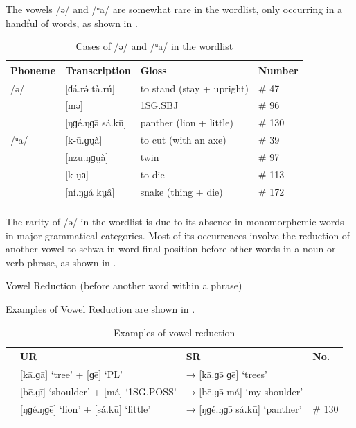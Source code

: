 \documentclass[output=paper,colorlinks,citecolor=brown
]{langscibook}
\begin{document}
The vowels /ə/ and /ᵘa/ are somewhat rare in the wordlist, only occurring in a handful of words, as shown in .

\begin{table}
\caption{Cases of /ə/ and /ᵘa/ in the wordlist}
\label{tab:olson:schwadiphthong}
 \begin{tabular}{llll}
  \lsptoprule
Phoneme & Transcription & Gloss & Number \\
  \midrule
/ə/ & [ɗá.rə́ tà.rú] & to stand (stay + upright) & \# 47 \\
    & [mə̄]         & 1SG.SBJ                      & \# 96 \\
    & [ŋɡé.ŋɡə̄ sá.kū] & panther (lion + little) & \# 130 \\
/ᵘa/ & [k-ū.ɡu̯à] & to cut (with an axe) & \# 39 \\
     & [nzū.ŋɡu̯à] & twin & \# 97 \\
     & [k-u̯a᷆]     & to die & \# 113 \\
     & [ní.ŋɡá ku̯â] & snake (thing + die) & \# 172 \\
  \lspbottomrule
 \end{tabular}
\end{table}

The rarity of /ə/ in the wordlist is due to its absence in monomorphemic words in major grammatical categories. Most of its occurrences involve the reduction of another vowel to schwa in word-final position before other words in a noun or verb phrase, as shown in .

\ea \label{ex:olson:vowelreduction}
Vowel Reduction (before another word within a phrase) \\
\z

Examples of Vowel Reduction are shown in .

\begin{table}
\caption{Examples of vowel reduction}
\label{tab:olson:vowelreduction}
 \begin{tabular}{@{}l@{}lll}
  \lsptoprule
          & UR & SR & No. \\
  \midrule
 & [kā.ɡā] ‘tree’ + [ɡē] ‘PL’ & → [kā.ɡə̄ ɡē] ‘trees’ & \\
 & [bē.ɡī] ‘shoulder’ + [má] ‘1SG.POSS’ & → [bē.ɡə̄ má] ‘my shoulder’ & \\
 & [ŋɡé.ŋɡē] ‘lion’ + [sá.kū] ‘little’ & → [ŋɡé.ŋɡə̄ sá.kū] ‘panther’ & \# 130 \\
  \lspbottomrule
 \end{tabular}
\end{table}
\end{document}
